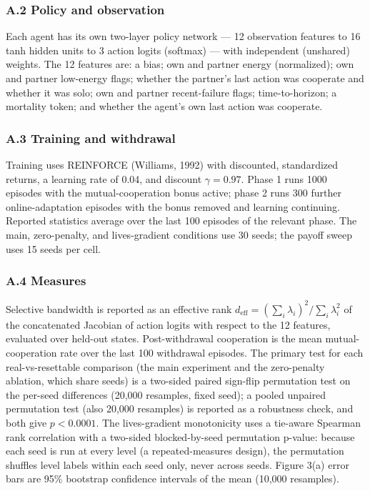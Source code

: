 \documentclass[Afour,sageh,times,doublespace]{sagej}
\begin{document}
\subsubsection{A.2 Policy and observation}\label{a.2-policy-and-observation}

Each agent has its own two-layer policy network --- 12 observation features to 16 tanh hidden units to 3 action logits (softmax) --- with independent (unshared) weights. The 12 features are: a bias; own and partner energy (normalized); own and partner low-energy flags; whether the partner's last action was cooperate and whether it was solo; own and partner recent-failure flags; time-to-horizon; a mortality token; and whether the agent's own last action was cooperate.

\subsubsection{A.3 Training and withdrawal}\label{a.3-training-and-withdrawal}

Training uses REINFORCE (Williams, 1992) with discounted, standardized returns, a learning rate of 0.04, and discount \(\gamma = 0.97\). Phase 1 runs 1000 episodes with the mutual-cooperation bonus active; phase 2 runs 300 further online-adaptation episodes with the bonus removed and learning continuing. Reported statistics average over the last 100 episodes of the relevant phase. The main, zero-penalty, and lives-gradient conditions use 30 seeds; the payoff sweep uses 15 seeds per cell.

\subsubsection{A.4 Measures}\label{a.4-measures}

Selective bandwidth is reported as an effective rank \(d_{\mathrm{eff}} = (\sum_i \lambda_i)^2 / \sum_i \lambda_i^2\) of the concatenated Jacobian of action logits with respect to the 12 features, evaluated over held-out states. Post-withdrawal cooperation is the mean mutual-cooperation rate over the last 100 withdrawal episodes. The primary test for each real-vs-resettable comparison (the main experiment and the zero-penalty ablation, which share seeds) is a two-sided paired sign-flip permutation test on the per-seed differences (20,000 resamples, fixed seed); a pooled unpaired permutation test (also 20,000 resamples) is reported as a robustness check, and both give \(p < 0.0001\). The lives-gradient monotonicity uses a tie-aware Spearman rank correlation with a two-sided blocked-by-seed permutation p-value: because each seed is run at every level (a repeated-measures design), the permutation shuffles level labels within each seed only, never across seeds. Figure 3(a) error bars are 95\% bootstrap confidence intervals of the mean (10,000 resamples).
\end{document}
